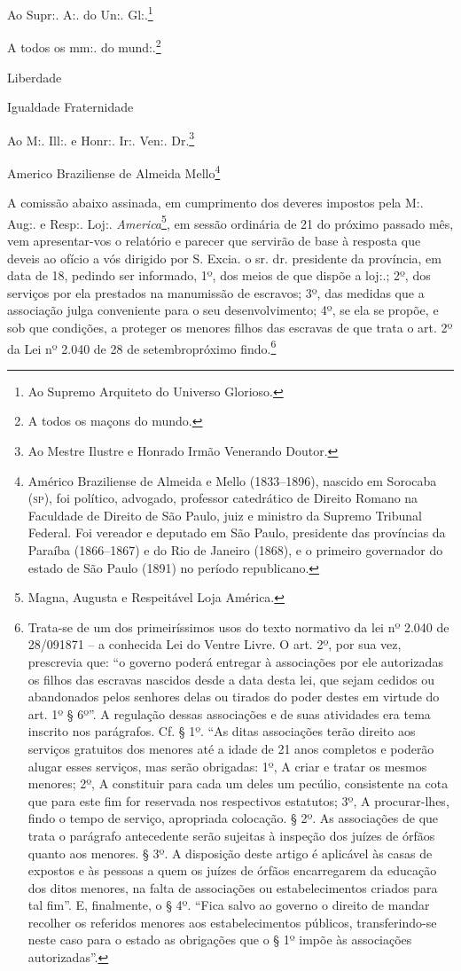 {Ao Supr:. A:. do Un:. Gl:.\footnote{ Ao Supremo Arquiteto do Universo
  Glorioso.}

A todos os mm:. do mund:.\footnote{ A todos os maçons do mundo.}

Liberdade

Igualdade Fraternidade

Ao M:. Ill:. e Honr:. Ir:. Ven:. Dr.\footnote{ Ao Mestre Ilustre e
  Honrado Irmão Venerando Doutor.}

Americo Braziliense de Almeida Mello\footnote{ Américo Braziliense de
  Almeida e Mello (1833--1896), nascido em Sorocaba (\textsc{sp}), foi político,
  advogado, professor catedrático de Direito Romano na Faculdade de
  Direito de São Paulo, juiz e ministro da Supremo Tribunal Federal. Foi
  vereador e deputado em São Paulo, presidente das províncias da Paraíba
  (1866--1867) e do Rio de Janeiro (1868), e o primeiro governador do
  estado de São Paulo (1891) no período republicano.}

A comissão abaixo assinada, em cumprimento dos deveres impostos pela M:.
Aug:. e Resp:. Loj:. \emph{America}\footnote{ Magna, Augusta e
  Respeitável Loja América.}, em sessão ordinária de 21 do próximo
passado mês, vem apresentar-vos o relatório e parecer que servirão de
base à resposta que deveis ao ofício a vós dirigido por S. Excia. o sr.
dr. presidente da província, em data de 18, pedindo ser informado, 1º,
dos meios de que dispõe a loj:.; 2º, dos serviços por ela prestados na
manumissão de escravos; 3º, das medidas que a associação julga
conveniente para o seu desenvolvimento; 4º, se ela se propõe, e sob que
condições, a proteger os menores filhos das escravas de que trata o art.
2º da Lei nº 2.040 de 28 de setembropróximo findo.\footnote{ Trata-se
  de um dos primeiríssimos usos do texto normativo da lei nº 2.040 de
  28/091871 -- a conhecida Lei do Ventre Livre. O art. 2º, por sua vez,
  prescrevia que: ``o governo poderá entregar à associações por ele
  autorizadas os filhos das escravas nascidos desde a data desta lei,
  que sejam cedidos ou abandonados pelos senhores delas ou tirados do
  poder destes em virtude do art. 1º § 6º''. A regulação dessas
  associações e de suas atividades era tema inscrito nos parágrafos. Cf.
  § 1º. ``As ditas associações terão direito aos serviços gratuitos dos
  menores até a idade de 21 anos completos e poderão alugar esses
  serviços, mas serão obrigadas: 1º, A criar e tratar os mesmos menores;
  2º, A constituir para cada um deles um pecúlio, consistente na cota
  que para este fim for reservada nos respectivos estatutos; 3º, A
  procurar-lhes, findo o tempo de serviço, apropriada colocação. § 2º.
  As associações de que trata o parágrafo antecedente serão sujeitas à
  inspeção dos juízes de órfãos quanto aos menores. § 3º. A disposição
  deste artigo é aplicável às casas de expostos e às pessoas a quem os
  juízes de órfãos encarregarem da educação dos ditos menores, na falta
  de associações ou estabelecimentos criados para tal fim''. E,
  finalmente, o § 4º. ``Fica salvo ao governo o direito de mandar
  recolher os referidos menores aos estabelecimentos públicos,
  transferindo-se neste caso para o estado as obrigações que o § 1º
  impõe às associações autorizadas''.}

}
